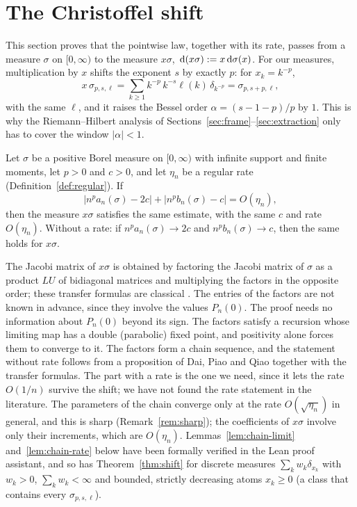 
\section{The Christoffel shift}\label{sec:shift}

This section proves that the pointwise law, together with its rate, passes from a measure $\sigma$ on $[0,\infty)$ to
the measure $x\sigma$, $\,\mathrm{d}(x\sigma):=x\,\mathrm{d}\sigma(x)$. For our measures, multiplication by $x$ shifts the exponent
$s$ by exactly $p$: for $x_k=k^{-p}$,
\begin{equation}\label{eq:shift-identity}
  x\,\sigma_{p,s,\ell}=\sum_{k\ge1}k^{-p}\,k^{-s}\ell(k)\,\delta_{k^{-p}}=\sigma_{p,s+p,\ell},
\end{equation}
with the same $\ell$, and it raises the Bessel order $\alpha=(s-1-p)/p$ by $1$. This is why the Riemann--Hilbert
analysis of Sections~\ref{sec:frame}--\ref{sec:extraction} only has to cover the window $|\alpha|<1$.

\begin{theorem}\label{thm:shift}
Let $\sigma$ be a positive Borel measure on $[0,\infty)$ with infinite support and finite moments, let $p>0$ and
$c>0$, and let $\eta_n$ be a regular rate \textup{(}Definition~\textup{\ref{def:regular})}. If
\[
  |n^pa_n(\sigma)-2c|+|n^pb_n(\sigma)-c|=O(\eta_n),
\]
then the measure $x\sigma$ satisfies the same estimate, with the same $c$ and rate $O(\eta_n)$. Without a rate: if
$n^pa_n(\sigma)\to2c$ and $n^pb_n(\sigma)\to c$, then the same holds for $x\sigma$.
\end{theorem}

The Jacobi matrix of $x\sigma$ is obtained by factoring the Jacobi matrix of $\sigma$ as a product $LU$ of bidiagonal
matrices and multiplying the factors in the opposite order; these transfer formulas are classical
\cite[\S1]{DD}. The entries of the factors are not known in advance, since they involve the values $P_n(0)$. The proof needs no
information about $P_n(0)$ beyond its sign. The factors satisfy a recursion whose limiting map has a double
(parabolic) fixed point, and positivity alone forces them to converge to it. The factors
form a chain sequence, and the statement without rate follows from a proposition of Dai, Piao and Qiao
\cite[Proposition~2.1]{DPQ} together with the transfer formulas. The part with a rate is the one we need, since it lets
the rate $O(1/n)$ survive the shift; we have not found the rate statement in the literature. The parameters of the
chain converge only at the rate $O(\sqrt{\eta_n})$ in general, and this is sharp (Remark~\ref{rem:sharp}); the
coefficients of $x\sigma$ involve only their increments, which are $O(\eta_n)$. Lemmas~\ref{lem:chain-limit}
and~\ref{lem:chain-rate} below have been formally verified in the Lean proof assistant, and so has
Theorem~\ref{thm:shift} for discrete measures $\sum_kw_k\delta_{x_k}$ with $w_k>0$, $\sum_kw_k<\infty$ and bounded,
strictly decreasing atoms $x_k\ge0$ (a class that contains every $\sigma_{p,s,\ell}$).

